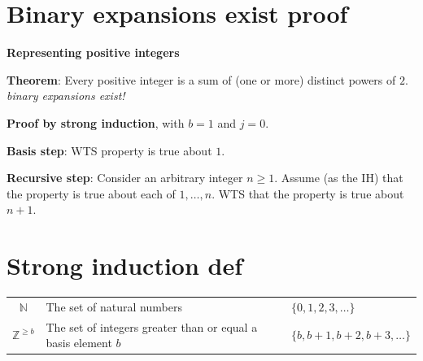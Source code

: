 \documentclass[12pt, oneside]{article}
\begin{document}
\vfill \vfill
\section*{Binary expansions exist proof}


{\bf  Representing positive integers}


{\bf Theorem}: Every positive integer is a sum of (one or more) distinct powers of $2$. {\it  
binary expansions exist!}



{\bf Proof by strong induction}, with $b=1$ and $j=0$.


{\bf Basis step}:  WTS property is true about  $1$.


{\bf Recursive step}: Consider an arbitrary integer $n \geq 1$.
Assume (as the IH) that the property is true about  each of $1, \ldots, n$.  
WTS that the property is true about  $n+1$.


\vfill
 \vfill
\section*{Strong induction def}



\vfill

\begin{center}
    \begin{tabular}{cll}
    $\mathbb{N}$  &  The set of  natural numbers & $\{ 0, 1, 2, 3, \ldots \}$ \\
$\mathbb{Z}^{\geq b}$ & The set of integers greater than  or equal  a  basis element $b$ & $\{ b, b+1, b+2, b+3,  \ldots  \}$ \\
    \end{tabular}
    \end{center}
    
\end{document}
